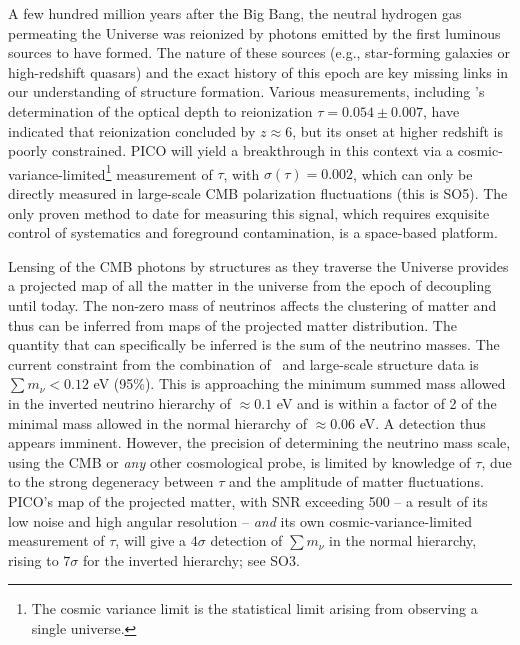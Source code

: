 \documentclass[PICOReport.tex]{subfiles}
\begin{document}
A few hundred million years after the Big Bang, the neutral hydrogen gas permeating the Universe was reionized by photons emitted by the first luminous sources to have formed.  The nature of these sources (e.g., star-forming galaxies or high-redshift quasars) and the exact history of this epoch are key missing links in our understanding of structure formation.  Various measurements, including \planck 's determination of the optical depth to reionization $\tau = 0.054 \pm 0.007$, have indicated that reionization concluded by $z \approx 6$, but its onset at higher redshift is poorly constrained. PICO will yield a breakthrough in this context via a cosmic-variance-limited\footnote{The cosmic variance limit is the statistical limit arising from observing a single universe.} measurement of $\tau$, with $\sigma(\tau)=0.002$, which can only be directly measured in large-scale CMB polarization fluctuations (this is SO5).  The only proven method to date for measuring this signal, which requires exquisite control of systematics and foreground contamination, is a space-based platform. 

Lensing of the CMB photons by structures as they traverse the Universe provides a projected map of all the matter in the universe from the epoch of decoupling until today.  The non-zero mass of neutrinos affects the clustering of matter and thus can be inferred from maps of the projected matter distribution. The quantity that can specifically be inferred is the sum of the neutrino masses.  The current constraint from the combination of \planck\ and large-scale structure data is $\sum m_{\nu} < 0.12$ eV (95\%).  This is approaching the minimum summed mass allowed in the inverted neutrino hierarchy of $\approx 0.1$ eV and is within a factor of 2 of the minimal mass allowed in the normal hierarchy of $\approx 0.06$ eV.  A detection thus appears imminent.  However, the precision of determining the neutrino mass scale, using the CMB or {\it any} other cosmological probe, is limited by knowledge of $\tau$, due to the strong degeneracy between $\tau$ and the amplitude of matter fluctuations.  PICO's map of the projected matter, with \ac{SNR} exceeding 500 -- a result of its low noise and high angular resolution -- {\it and} its own cosmic-variance-limited measurement of $\tau$, will give a $4\sigma$ detection of $\sum m_{\nu}$ in the normal hierarchy, rising to $7\sigma$ for the inverted hierarchy; see SO3. 

\end{document}
